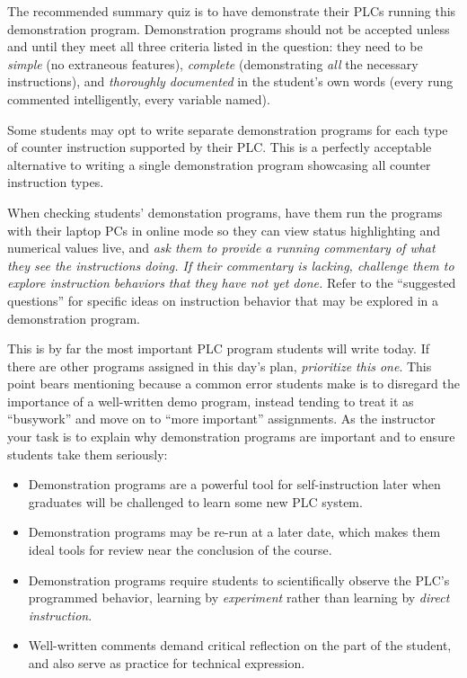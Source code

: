 The recommended summary quiz is to have  demonstrate their PLCs running this demonstration program.  Demonstration programs should not be accepted unless and until they meet all three criteria listed in the question: they need to be {\it simple} (no extraneous features), {\it complete} (demonstrating {\it all} the necessary instructions), and {\it thoroughly documented} in the student's own words (every rung commented intelligently, every variable named).

\vskip 10pt

Some students may opt to write separate demonstration programs for each type of counter instruction supported by their PLC.  This is a perfectly acceptable alternative to writing a single demonstration program showcasing all counter instruction types.

\vskip 10pt

When checking students' demonstation programs, have them run the programs with their laptop PCs in online mode so they can view status highlighting and numerical values live, and {\it ask them to provide a running commentary of what they see the instructions doing.  If their commentary is lacking, challenge them to explore instruction behaviors that they have not yet done.}  Refer to the ``suggested questions'' for specific ideas on instruction behavior that may be explored in a demonstration program.

\vskip 10pt

This is by far the most important PLC program students will write today.  If there are other programs assigned in this day's plan, {\it prioritize this one}.  This point bears mentioning because a common error students make is to disregard the importance of a well-written demo program, instead tending to treat it as ``busywork'' and move on to ``more important'' assignments.  As the instructor your task is to explain why demonstration programs are important and to ensure students take them seriously:

\begin{itemize}
\item{} Demonstration programs are a powerful tool for self-instruction later when graduates will be challenged to learn some new PLC system.
\vskip 5pt
\item{} Demonstration programs may be re-run at a later date, which makes them ideal tools for review near the conclusion of the course.
\vskip 5pt
\item{} Demonstration programs require students to scientifically observe the PLC's programmed behavior, learning by {\it experiment} rather than learning by {\it direct instruction}.
\vskip 5pt
\item{} Well-written comments demand critical reflection on the part of the student, and also serve as practice for technical expression.
\end{itemize}









